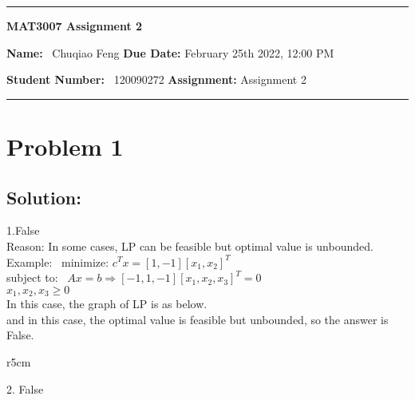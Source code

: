 \documentclass{article}
\begin{document}
\rmfamily 
\hrule
\begin{center}
	\vspace{.4cm}
	{\textbf { \huge MAT3007 Assignment 2}}
\end{center}
\setlength{\baselineskip}{20pt}
\noindent
{\textbf{Name:} \ Chuqiao Feng \hspace{\fill} \textbf{Due Date:} February 25th 2022, 12:00 PM \\ 
{\textbf{Student Number:} \ 120090272 \hspace{\fill} \textbf{Assignment:} Assignment 2 \\
\hrule

\section*{Problem 1}
\subsection*{Solution:}
\large
1.\quad False \\ 
Reason: In some cases, LP can be feasible but optimal value is unbounded.\\
Example: \, minimize:  $c^Tx = [1, -1][x_1, x_2]^T$ \\
\hspace*{60pt}subject to: \, $Ax=b \Rightarrow [-1, 1, -1][x_1, x_2, x_3]^T = 0$\\
\hspace*{120pt} $x_1, x_2, x_3 \geq 0$ \\ 
In this case, the graph of LP is as below.\\
and in this case, the optimal value is feasible but unbounded, so the answer is False.\\ 
\begin{wrapfigure}{r}{5cm}
\end{wrapfigure}
2. \quad False \\ 
}}
\end{document}
